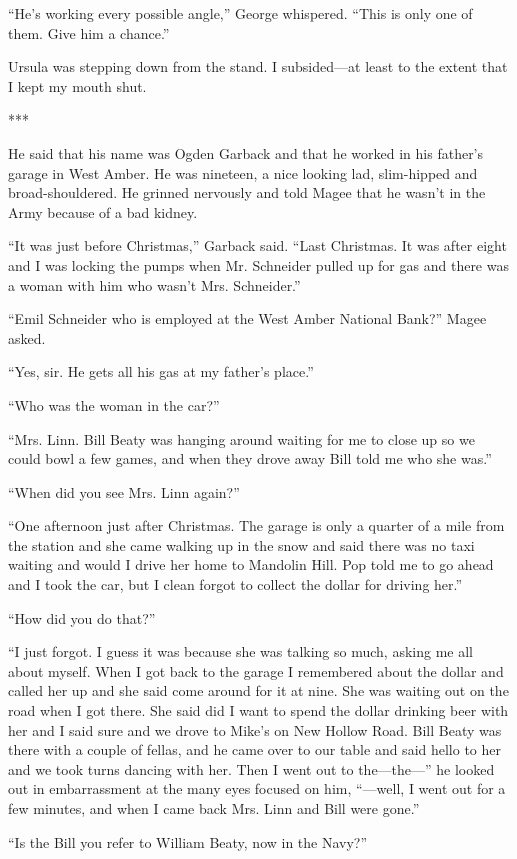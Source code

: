 \documentclass{novel}
\begin{document}
“He’s working every possible angle,” George whispered. “This is only one of them. Give him a chance.”

Ursula was stepping down from the stand. I subsided—at least to the extent that I kept my mouth shut.

***

He said that his name was Ogden Garback and that he worked in his father’s garage in West Amber. He was nineteen, a nice looking lad, slim-hipped and broad-shouldered. He grinned nervously and told Magee that he wasn’t in the Army because of a bad kidney.

“It was just before Christmas,” Garback said. “Last Christmas. It was after eight and I was locking the pumps when Mr. Schneider pulled up for gas and there was a woman with him who wasn’t Mrs. Schneider.”

“Emil Schneider who is employed at the West Amber National Bank?” Magee asked.

“Yes, sir. He gets all his gas at my father’s place.”

“Who was the woman in the car?”

“Mrs. Linn. Bill Beaty was hanging around waiting for me to close up so we could bowl a few games, and when they drove away Bill told me who she was.”

“When did you see Mrs. Linn again?”

“One afternoon just after Christmas. The garage is only a quarter of a mile from the station and she came walking up in the snow and said there was no taxi waiting and would I drive her home to Mandolin Hill. Pop told me to go ahead and I took the car, but I clean forgot to collect the dollar for driving her.”

“How did you do that?”

“I just forgot. I guess it was because she was talking so much, asking me all about myself. When I got back to the garage I remembered about the dollar and called her up and she said come around for it at nine. She was waiting out on the road when I got there. She said did I want to spend the dollar drinking beer with her and I said sure and we drove to Mike’s on New Hollow Road. Bill Beaty was there with a couple of fellas, and he came over to our table and said hello to her and we took turns dancing with her. Then I went out to the—the—” he looked out in embarrassment at the many eyes focused on him, “—well, I went out for a few minutes, and when I came back Mrs. Linn and Bill were gone.”

“Is the Bill you refer to William Beaty, now in the Navy?”
\end{document}
